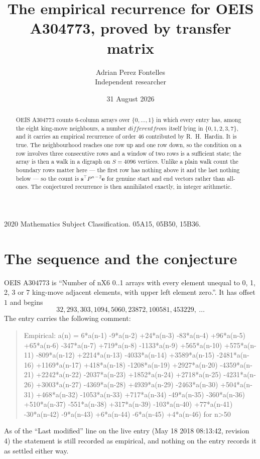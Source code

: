 \documentclass[11pt,a4paper]{article}
\title{The empirical recurrence for OEIS A304773, proved by transfer matrix}
\author{Adrian Perez Fontelles\\ \small Independent researcher}
\date{31 August 2026}
\theoremstyle{plain}
\theoremstyle{definition}
\begin{document}
\maketitle

\begin{abstract}
OEIS A304773 counts $6$-column arrays over $\{0,\dots,1\}$ in which every entry has,
among the eight king-move neighbours, a number $different from$ itself lying in $\{0,1,2,3,7\}$, and it carries an empirical
recurrence of order $46$ contributed by R.~H.~Hardin. It is true. The neighbourhood
reaches one row up and one row down, so the condition on a row involves three consecutive
rows and a window of two rows is a sufficient state; the array is then a walk in a digraph
on $S=4096$ vertices. Unlike a plain walk count the boundary rows matter here --- the first
row has nothing above it and the last nothing below --- so the count is
$\mathbf{s}^{\!\top}P^{\,n-2}\mathbf{e}$ for genuine start and end vectors rather than
all-ones. The conjectured recurrence is then annihilated exactly, in integer arithmetic.
\end{abstract}

\noindent\small 2020 Mathematics Subject Classification. 05A15, 05B50, 15B36.\normalsize

\section{The sequence and the conjecture}

OEIS A304773 is ``Number of nX6 0..1 arrays with every element unequal to 0, 1, 2, 3 or 7 king-move adjacent elements, with upper left element zero.''. It has offset
$1$ and begins
\[
32, 293, 303, 1094, 5060, 23872, 100581, 453229,\ \dots
\]
The entry carries the following comment:
\begin{quote}\small
Empirical: a(n) = 6*a(n-1) -9*a(n-2) +24*a(n-3) -83*a(n-4) +96*a(n-5) +65*a(n-6) -347*a(n-7) +719*a(n-8) -1133*a(n-9) +565*a(n-10) +575*a(n-11) -809*a(n-12) +2214*a(n-13) -4033*a(n-14) +3589*a(n-15) -2481*a(n-16) +1169*a(n-17) +418*a(n-18) -1208*a(n-19) +2927*a(n-20) -4359*a(n-21) +2242*a(n-22) -2037*a(n-23) +1852*a(n-24) +2718*a(n-25) -4231*a(n-26) +3003*a(n-27) -4369*a(n-28) +4939*a(n-29) -2463*a(n-30) +504*a(n-31) +468*a(n-32) -1053*a(n-33) +717*a(n-34) -49*a(n-35) -360*a(n-36) +510*a(n-37) -551*a(n-38) +317*a(n-39) -103*a(n-40) +77*a(n-41) -30*a(n-42) -9*a(n-43) +6*a(n-44) -6*a(n-45) +4*a(n-46) for n>50
\end{quote}
As of the ``Last modified'' line on the live entry (May 18 2018 08:13:42, revision
4) the statement is still recorded as empirical, and nothing on the entry
records it as settled either way.
\end{document}
